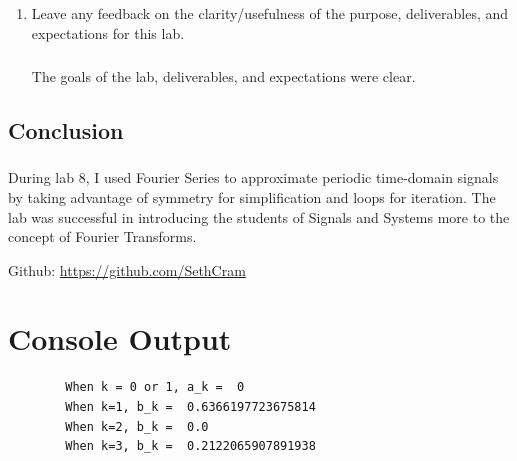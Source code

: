 \documentclass[12pt]{report}
\begin{document}
\begin{enumerate}
        \item Leave any feedback on the clarity/usefulness of the purpose, deliverables, and expectations for this lab.
        \paragraph{} The goals of the lab, deliverables, and expectations were clear. 
    \end{enumerate}

\section{Conclusion}


    \paragraph{} During lab 8, I used Fourier Series to approximate periodic time-domain signals by taking advantage of symmetry for simplification  and loops for iteration. The lab was successful in introducing the students of Signals and Systems more to the concept of Fourier Transforms.   
    
    Github: \url{https://github.com/SethCram} 

\appendix

\chapter{Console Output}
    \begin{lstlisting}
        When k = 0 or 1, a_k =  0
        When k=1, b_k =  0.6366197723675814
        When k=2, b_k =  0.0
        When k=3, b_k =  0.2122065907891938
    \end{lstlisting}

\newpage
\end{document}

